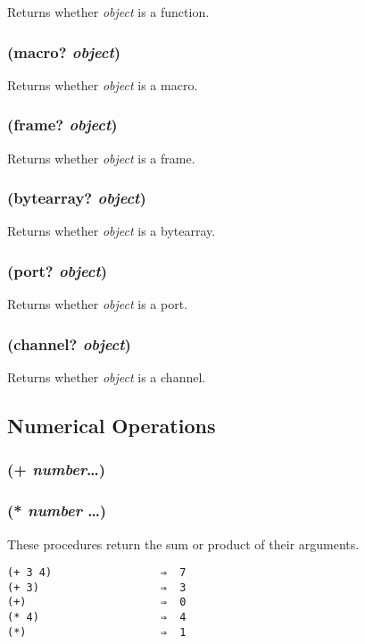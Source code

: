 \documentclass{article}
\begin{document}
Returns whether \emph{object} is a function.

\subsubsection{(macro? \emph{object})}

Returns whether \emph{object} is a macro.

\subsubsection{(frame? \emph{object})}

Returns whether \emph{object} is a frame.

\subsubsection{(bytearray? \emph{object})}

Returns whether \emph{object} is a bytearray.

\subsubsection{(port? \emph{object})}

Returns whether \emph{object} is a port.

\subsubsection{(channel? \emph{object})}

Returns whether \emph{object} is a channel.

\subsection{Numerical Operations}

\subsubsection{(+ \emph{number}\ldots{})}

\subsubsection{(* \emph{number} \ldots{})}

These procedures return the sum or product of their arguments.

\begin{verbatim}
(+ 3 4)                 ⇒  7
(+ 3)                   ⇒  3
(+)                     ⇒  0
(* 4)                   ⇒  4
(*)                     ⇒  1
\end{verbatim}
\end{document}
